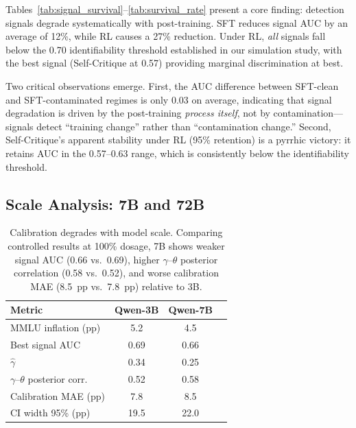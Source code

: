 \documentclass[letterpaper, 10pt, twocolumn]{article}
\begin{document}
Tables~\ref{tab:signal_survival}--\ref{tab:survival_rate} present a core finding: detection signals degrade systematically with post-training.
SFT reduces signal AUC by an average of 12\%, while RL causes a 27\% reduction.
Under RL, \emph{all} signals fall below the 0.70 identifiability threshold established in our simulation study, with the best signal (Self-Critique at 0.57) providing marginal discrimination at best.

Two critical observations emerge.
First, the AUC difference between SFT-clean and SFT-contaminated regimes is only 0.03 on average, indicating that signal degradation is driven by the post-training \emph{process itself}, not by contamination---signals detect ``training change'' rather than ``contamination change.''
Second, Self-Critique's apparent stability under RL (95\% retention) is a pyrrhic victory: it retains AUC in the 0.57--0.63 range, which is consistently below the identifiability threshold.

\subsection{Scale Analysis: 7B and 72B}
\label{sec:scale}

\begin{table}[t]
\centering
\caption{Calibration degrades with model scale. Comparing controlled results at 100\% dosage, 7B shows weaker signal AUC (0.66 vs.\ 0.69), higher $\gamma$--$\theta$ posterior correlation (0.58 vs.\ 0.52), and worse calibration MAE (8.5~pp vs.\ 7.8~pp) relative to 3B.}
\label{tab:7b_comparison}
\small
\begin{tabular}{lccc}
\toprule
Metric & Qwen-3B & Qwen-7B \\
\midrule
MMLU inflation (pp) & 5.2 & 4.5 \\
Best signal AUC & 0.69 & 0.66 \\
$\hat{\gamma}$ & 0.34 & 0.25 \\
$\gamma$--$\theta$ posterior corr.\ & 0.52 & 0.58 \\
Calibration MAE (pp) & 7.8 & 8.5 \\
CI width 95\% (pp) & 19.5 & 22.0 \\
\bottomrule
\end{tabular}
\end{table}
\end{document}
